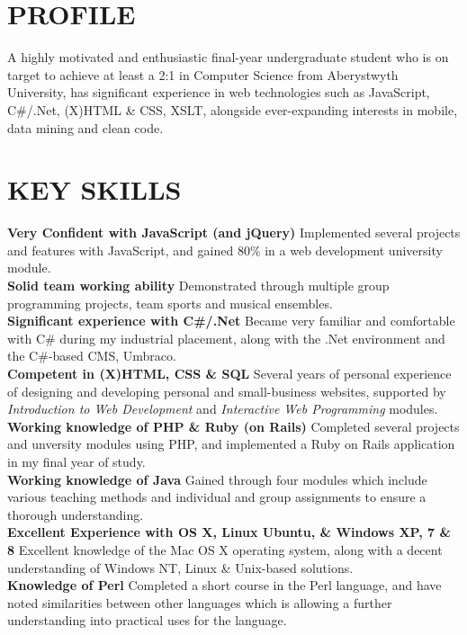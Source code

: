 \documentclass[line,margin]{res}
\begin{document}
\address{Harvington, 2 Penglais Terrace, Aberystwyth, SY23 2ET}
\address{+44 (0) 78927 18071\\me@edparry.com\\edparry.com}
 
\begin{resume}
 
\section{PROFILE}A highly motivated and enthusiastic final-year undergraduate student who is on target to achieve at least a 2:1 in Computer Science from Aberystwyth University, has significant experience in web technologies such as JavaScript, C\#/.Net, (X)HTML \& CSS, XSLT, alongside ever-expanding interests in mobile, data mining and clean code.

\section{KEY SKILLS}
{\bf Very Confident with JavaScript (and jQuery)} Implemented several projects and features with JavaScript, and gained 80\% in a web development university module.\\
{\bf Solid team working ability} Demonstrated through multiple group programming projects, team sports and musical ensembles.\\
{\bf Significant experience with C\#/.Net} Became very familiar and comfortable with C\# during my industrial placement, along with the .Net environment and the C\#-based CMS, Umbraco.\\
{\bf Competent in (X)HTML, CSS \& SQL} Several years of personal experience of designing and developing personal and small-business websites, supported by {\sl Introduction to Web Development} and {\sl Interactive Web Programming} modules.\\
{\bf Working knowledge of PHP \& Ruby (on Rails)} Completed several projects and unversity modules using PHP, and implemented a Ruby on Rails application in my final year of study.\\
{\bf Working knowledge of Java} Gained through four modules which include various teaching methods and individual and group assignments to ensure a thorough understanding.\\
{\bf Excellent Experience with OS X, Linux Ubuntu, \& Windows XP, 7 \& 8} Excellent knowledge of the Mac OS X operating system, along with a decent understanding of Windows NT, Linux \& Unix-based solutions.\\
{\bf Knowledge of Perl} Completed a short course in the Perl language, and have noted similarities between other languages which is allowing a further understanding into practical uses for the language.
 

\end{resume}
\end{document}
